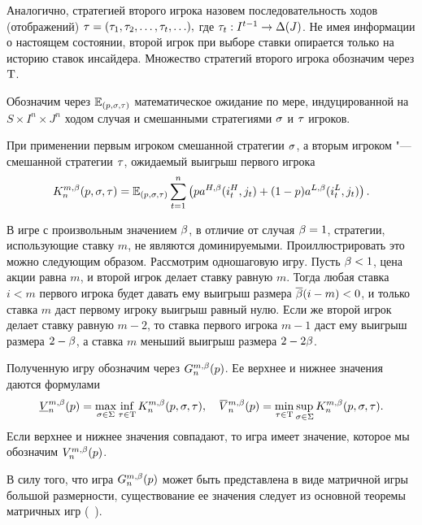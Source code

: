 {Аналогично, стратегией второго игрока назовем последовательность ходов (отображений) 
$\tau = (\tau_{1}, \tau_{2}, \ldots, \tau_{t}, \ldots),$ где 
$\tau_{t}: I^{t-1} \rightarrow \Delta(J)$.
Не имея информации о настоящем состоянии, второй игрок при выборе ставки опирается только на историю ставок инсайдера.
Множество стратегий второго игрока обозначим через $\mathrm{T}$.

Обозначим через $\operatorname{\mathbb{E}}_{(p,\sigma,\tau)}$ математическое ожидание по мере, индуцированной на $S \times I^n \times J^n$ ходом случая и смешанными стратегиями $\sigma$ и $\tau$ игроков.

При применении первым игроком смешанной стратегии $\sigma$, а вторым игроком "--- смешанной стратегии $\tau$, ожидаемый выигрыш первого игрока
\begin{equation}
  \label{ch1:eq:firstPlayerPayoff}
  \K*{n}(p, \sigmar, \taur) = \E_{(p,\sigmar,\taur)} \sum_{t=1}^n
  \left(
    p \as[H](i_t^H, j_t) + (1 - p)\as[L](i_t^L, j_t)
  \right).
\end{equation}

\begin{remark}
  В игре с произвольным значением $\beta$, в отличие от случая $\beta = 1$, стратегии, использующие ставку $m$, не являются доминируемыми.
  Проиллюстрировать это можно следующим образом.
  Рассмотрим одношаговую игру.
  Пусть $\beta < 1$, цена акции равна $m$, и второй игрок делает ставку равную $m$.
  Тогда любая ставка $i < m$ первого игрока будет давать ему выигрыш размера ${{\overline{\beta}}} (i - m) < 0$, и только ставка $m$ даст первому игроку выигрыш равный нулю. 
  Если же второй игрок делает ставку равную $m-2$, то ставка первого игрока $m-1$ даст ему выигрыш размера $2-\beta$, а ставка $m$ меньший выигрыш размера $2-2\beta$.
\end{remark}

Полученную игру обозначим через $\theG*{n}(p)$.
Ее верхнее и нижнее значения даются формулами
\begin{equation*}
  \LowV*{n}(p) = \max_{\sigmar \in \Sigma} \inf_{\taur \in \Tau}
  \K*{n}(p, \sigmar, \taur), \quad
  \HighV*{n}(p) = \min_{\taur \in \Tau} \sup_{\sigmar \in \Sigma}
  \K*{n}(p, \sigmar, \taur).
\end{equation*}
Если верхнее и нижнее значения совпадают, то игра имеет значение, которое мы обозначим $\V*{n}(p)$.

\begin{remark}
  В силу того, что игра $\theG*{n}(p)$ может быть представлена в виде матричной игры большой размерности, существование ее значения следует из основной теоремы матричных игр (\seename~\cite{morozov08}).
\end{remark}

}
